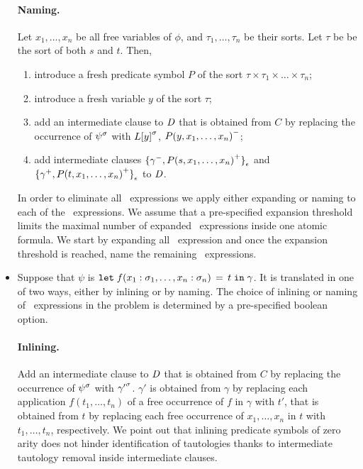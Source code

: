 \begin{itemize}
    \paragraph{Naming.} Let $x_1,\ldots,x_n$ be all free variables of $\phi$, and $\tau_1,\ldots,\tau_n$ be their sorts. Let $\tau$ be be the sort of both $s$ and $t$. Then,
    \begin{enumerate}
      \item introduce a fresh predicate symbol $P$ of the sort $\tau\times\tau_1\times\ldots\times\tau_n$;
      \item introduce a fresh variable $y$ of the sort $\tau$;
      \item add an intermediate clause to $\mathit{D}$ that is obtained from $C$ by replacing the occurrence of ${\psi}^{\sigma}$ with ${L[y]}^{\sigma}$, ${P(y,x_1,\ldots,x_n)}^{-}$;
      \item add intermediate clauses ${\{{\gamma}^{-},{P(s,x_1,\ldots,x_n)}^{+}\}}_{\epsilon}$ and\\${\{{\gamma}^{+},\allowbreak{P(t,\allowbreak x_1,\allowbreak \ldots,x_n)}^{+}\}}_{\epsilon}$ to $\mathit{D}$.
    \end{enumerate}

    In order to eliminate all \ITE\ expressions we apply either expanding or naming to each of the \ITE\ expressions. We assume that a pre-specified expansion threshold limits the maximal number of expanded \ITE\ expressions inside one atomic formula. We start by expanding all \ITE\ expression and once the expansion threshold is reached, name the remaining \ITE\ expressions.

  \item
    Suppose that $\psi$ is $\mathtt{let}\;{f(x_1:\sigma_1,\ldots,x_n:\sigma_n)}\,=\,{t}\;\allowbreak\mathtt{in}\;{\gamma}$. It is translated in one of two ways, either by inlining or by naming. The choice of inlining or naming of \LETIN\ expressions in the problem is determined by a pre-specified boolean option. %
    
    \paragraph{Inlining.} Add an intermediate clause to $\mathit{D}$ that is obtained from $C$ by replacing the occurrence of ${\psi}^{\sigma}$ with ${\gamma'}^{\sigma}$. $\gamma'$ is obtained from $\gamma$ by replacing each application $f(t_1,\ldots,t_n)$ of a free occurrence of $f$ in $\gamma$ with $t'$, that is obtained from $t$ by replacing each free occurrence of $x_1,\ldots,x_n$ in $t$ with $t_1,\ldots,t_n$, respectively. We point out that inlining predicate symbols of zero arity does not hinder identification of tautologies thanks to intermediate tautology removal inside intermediate clauses.


\end{itemize}
